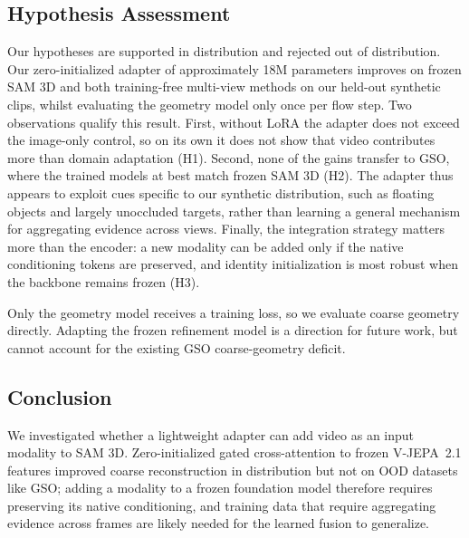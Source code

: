 \documentclass{article}
\begin{document}
\subsection{Hypothesis Assessment}
Our hypotheses are supported in distribution and rejected out of distribution.
Our zero-initialized adapter of approximately 18M parameters improves on frozen
SAM 3D and both training-free multi-view methods on our held-out synthetic
clips, whilst evaluating the geometry model only once per flow step. Two
observations qualify this result. First, without LoRA the adapter does not
exceed the image-only control, so on its own it does not show that video
contributes more than domain adaptation (H1). Second, none of the gains
transfer to GSO, where the trained models at best match frozen SAM 3D (H2).
The adapter thus appears to exploit cues specific to our synthetic
distribution, such as floating objects and largely unoccluded targets, rather
than learning a general mechanism for aggregating evidence across views.
Finally, the integration strategy matters more than the encoder: a new modality
can be added only if the native conditioning tokens are preserved, and identity
initialization is most robust when the backbone remains frozen (H3).



Only the geometry model receives a training loss, so we evaluate coarse geometry directly. Adapting the frozen refinement model is a direction for future work, but cannot account for the existing GSO coarse-geometry deficit.

\subsection{Conclusion}
We investigated whether a lightweight adapter can add video as an input
modality to SAM 3D. Zero-initialized gated cross-attention to frozen V-JEPA~2.1
features improved coarse reconstruction in distribution but not on OOD datasets like GSO; adding
a modality to a frozen foundation model therefore requires preserving its
native conditioning, and training data that require aggregating evidence across
frames are likely needed for the learned fusion to generalize.
\end{document}

